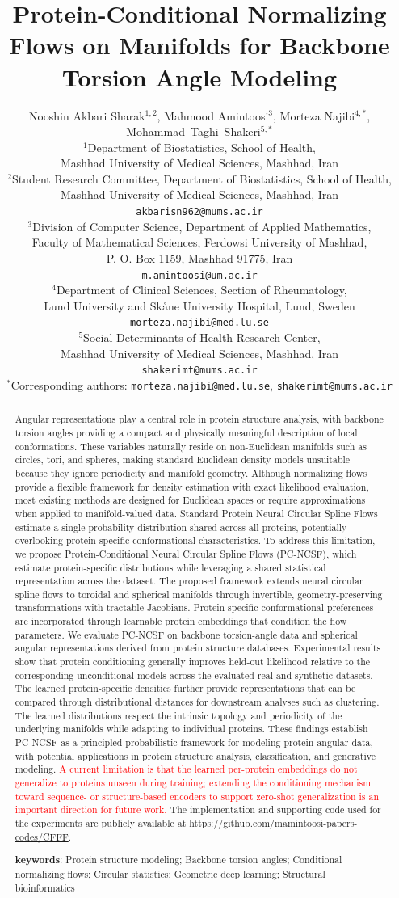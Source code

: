 \documentclass{article}
\title{Protein-Conditional Normalizing Flows on Manifolds for Backbone Torsion Angle Modeling}
\author{
Nooshin Akbari Sharak$^{1,2}$,
Mahmood Amintoosi$^{3}$,
Morteza Najibi$^{4,*}$,\\
Mohammad~Taghi~Shakeri$^{5,*}$ \\
$^{1}$Department of Biostatistics, School of Health,\\
Mashhad University of Medical Sciences, Mashhad, Iran \\
$^{2}$Student Research Committee, Department of Biostatistics, School of Health,\\
Mashhad University of Medical Sciences, Mashhad, Iran \\
\texttt{akbarisn962@mums.ac.ir} \\
$^{3}$Division of Computer Science, 
       Department of Applied Mathematics,\\
       Faculty of Mathematical Sciences,
       Ferdowsi University of Mashhad,\\
       P. O. Box 1159, Mashhad 91775, Iran \\
       \texttt{m.amintoosi@um.ac.ir}\\
$^{4}$Department of Clinical Sciences, Section of Rheumatology,\\
Lund University and Skåne University Hospital, Lund, Sweden \\
\texttt{morteza.najibi@med.lu.se} \\
$^{5}$Social Determinants of Health Research Center,\\
Mashhad University of Medical Sciences, Mashhad, Iran \\
\texttt{shakerimt@mums.ac.ir} \\
$^{*}$Corresponding authors: 
\texttt{morteza.najibi@med.lu.se}, 
\texttt{shakerimt@mums.ac.ir}
}
\date{}
\begin{document}
\maketitle

\begin{abstract}

Angular representations play a central role in protein structure analysis, with backbone torsion angles providing a compact and physically meaningful description of local conformations. These variables naturally reside on non-Euclidean manifolds such as circles, tori, and spheres, making standard Euclidean density models unsuitable because they ignore periodicity and manifold geometry. Although normalizing flows provide a flexible framework for density estimation with exact likelihood evaluation, most existing methods are designed for Euclidean spaces or require approximations when applied to manifold-valued data.
Standard Protein Neural Circular Spline Flows estimate a single probability distribution shared across all proteins, potentially overlooking protein-specific conformational characteristics. To address this limitation, we propose Protein-Conditional Neural Circular Spline Flows (PC-NCSF), which estimate protein-specific distributions while leveraging a shared statistical representation across the dataset. The proposed framework extends neural circular spline flows to toroidal and spherical manifolds through invertible, geometry-preserving transformations with tractable Jacobians. Protein-specific conformational preferences are incorporated through learnable protein embeddings that condition the flow parameters.
We evaluate PC-NCSF on backbone torsion-angle data and spherical angular representations derived from protein structure databases. {\color{red} Experimental results show that protein conditioning generally improves held-out likelihood relative to the corresponding unconditional models across the evaluated real and synthetic datasets. The learned protein-specific densities further provide representations that can be compared through distributional distances for downstream analyses such as clustering.} The learned distributions respect the intrinsic topology and periodicity of the underlying manifolds while adapting to individual proteins. These findings establish PC-NCSF as a principled probabilistic framework for modeling protein angular data, with potential applications in protein structure analysis, classification, and generative modeling. \textcolor{red}{A current limitation is that the learned per-protein embeddings do not generalize to proteins unseen during training; extending the conditioning mechanism toward sequence- or structure-based encoders to support
zero-shot generalization is an important direction for future work.} {\color{red} The implementation and supporting code used for the experiments are publicly available at \url{https://github.com/mamintoosi-papers-codes/CFFF}.}

\textbf{keywords}:
Protein structure modeling;
Backbone torsion angles;
Conditional normalizing flows;
Circular statistics;
Geometric deep learning;
Structural bioinformatics

\end{abstract}
\end{document}
